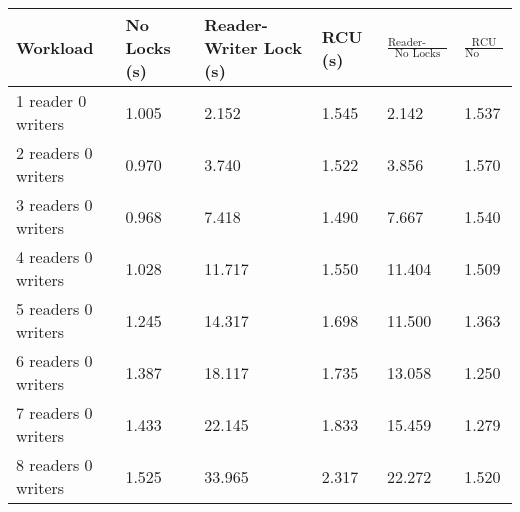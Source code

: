 \begin{tabular}{|l|p{1.5cm}|p{1.5cm}|p{1cm}|l|l|}
\hline Workload &No Locks (s) &Reader-Writer Lock (s) & RCU (s) & $\frac{\mbox{Reader-Writer Lock}}{\mbox{No Locks}}$ & $\frac{\mbox{RCU}}{\mbox{No Locks}}$ \\
\hline 1 reader 0 writers & 1.005 & 2.152 & 1.545&2.142&1.537\\
\hline 2 readers 0 writers & 0.970 & 3.740 & 1.522&3.856&1.570\\
\hline 3 readers 0 writers & 0.968 & 7.418 & 1.490&7.667&1.540\\
\hline 4 readers 0 writers & 1.028 & 11.717 & 1.550&11.404&1.509\\
\hline 5 readers 0 writers & 1.245 & 14.317 & 1.698&11.500&1.363\\
\hline 6 readers 0 writers & 1.387 & 18.117 & 1.735&13.058&1.250\\
\hline 7 readers 0 writers & 1.433 & 22.145 & 1.833&15.459&1.279\\
\hline 8 readers 0 writers & 1.525 & 33.965 & 2.317&22.272&1.520\\
\hline
\end{tabular}

